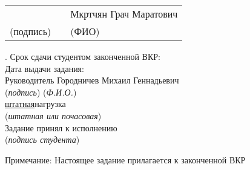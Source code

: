 {\noindent
\begin{tabular}{@{}p{}p{}p{}@{}}
\hrulefill & & \hspace{2em}Мкртчян Грач Маратович\\
\centering\footnotesize (подпись) & & \centering\footnotesize (ФИО)\\
\end{tabular}

\vspace{1.5em}

. Срок сдачи студентом законченной ВКР: \hrulefill\\
 \hspace{1em}Дата выдачи задания: \hrulefill\\
 \hspace{1em}Руководитель\underline{\hspace{7cm}} \hspace{1em}Городничев Михаил Геннадьевич\\
 \hspace*{5cm}(\textit{подпись}) \hspace{5cm}(\textit{Ф.И.О.})\\
 \noindent \underline{\hspace{7cm}}\underline{штатная}\underline{\hspace{6cm}}нагрузка\\
\hspace*{5cm}(\textit{штатная или почасовая})\\

\noindent Задание принял к исполнению\underline{\hspace{11cm}}\\
\hspace*{9cm}(\textit{подпись студента})\\
\begin{center}
    Примечание: Настоящее задание прилагается к законченной ВКР
\end{center}
}
\clearpage
\setcounter{page}{3}